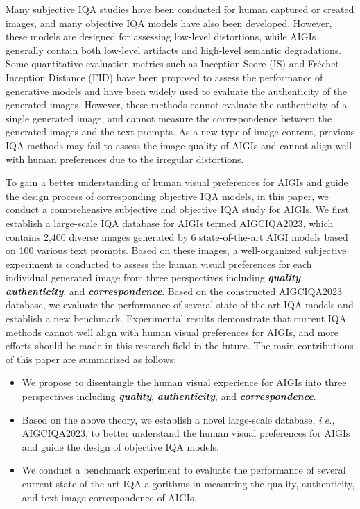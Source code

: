 \documentclass[runningheads]{llncs}
\begin{document}
Many subjective IQA studies have been conducted for human captured or created images, and many objective IQA models have also been developed.
However, these models are designed for assessing low-level distortions, while AIGIs generally contain both low-level artifacts and high-level semantic degradations.
Some quantitative evaluation metrics such as Inception Score (IS)\cite{gulrajani2017improved} and Fréchet Inception Distance (FID)\cite{heusel2017gans} have been proposed to assess the performance of generative models and have been widely used to evaluate the authenticity of the generated images.
However, these methods cannot evaluate the authenticity of a single generated image, and cannot measure the correspondence between the generated images and the text-prompts.
As a new type of image content, previous IQA methods may fail to assess the image quality of AIGIs and cannot align well with human preferences due to the irregular distortions. 

To gain a better understanding of human visual preferences for AIGIs and guide the design process of corresponding objective IQA models, in this paper, we conduct a comprehensive subjective and objective IQA study for AIGIs.
We first establish a large-scale IQA database for AIGIs termed AIGCIQA2023, which contains 2,400 diverse images generated by 6 state-of-the-art AIGI models based on 100 various text prompts. 
Based on these images, a well-organized subjective experiment is conducted to assess the human visual preferences for each individual generated image from three perspectives including 
\textbf{\textit{quality}}, \textbf{\textit{authenticity}}, and \textbf{\textit{correspondence}}. Based on the constructed AIGCIQA2023 database, we evaluate the performance of several state-of-the-art IQA models and establish a new benchmark. Experimental results demonstrate that current IQA methods cannot well align with human visual preferences for AIGIs, and more efforts should be made in this research field in the future. The main contributions of this paper are summarized as follows:

\begin{itemize}


\item We propose to disentangle the human visual experience for AIGIs into three perspectives including \textbf{\textit{quality}}, \textbf{\textit{authenticity}}, and \textbf{\textit{correspondence}}.
\item Based on the above theory, we establish a novel large-scale database, \textit{i.e.,} AIGCIQA2023, to better understand the human visual preferences for AIGIs and guide the design of objective IQA models.
\item We conduct a benchmark experiment to
evaluate the performance of several current state-of-the-art IQA algorithms in measuring the quality, authenticity, and text-image correspondence of AIGIs.

\end{itemize}
\end{document}
